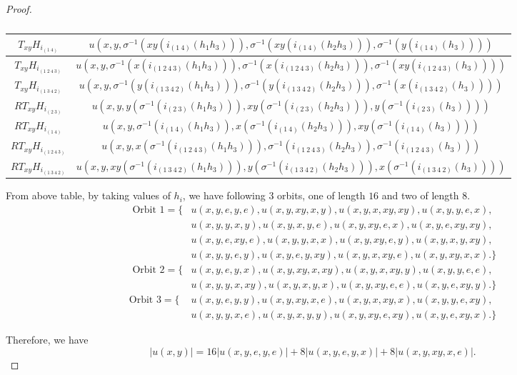 \documentclass[11pt,a4paper]{article}
\theoremstyle{definition}
\theoremstyle{remark}
\begin{document}
\begin{proof}
\begin{table}[H]
\begin{tabular}{|c|c|}
					$T_{xy}H_{i_{(1~4)}}$ & $u(x,y, \sigma^{-1}(xy(i_{(1~4)}(h_{1}h_{3}))),\sigma^{-1}(xy(i_{(1~4)}(h_{2}h_{3}))), \sigma^{-1}(y(i_{(1~4)}(h_{3}))))$ \\ \hline
					$T_{xy}H_{i_{(1~2~4~3)}}$ & $u(x,y, \sigma^{-1}(x(i_{(1~2~4~3)}(h_{1}h_{3}))),\sigma^{-1}(x(i_{(1~2~4~3)}(h_{2}h_{3}))), \sigma^{-1}(xy(i_{(1~2~4~3)}(h_{3}))))$ \\ \hline
					$T_{xy}H_{i_{(1~3~4~2)}}$ & $u(x,y, \sigma^{-1}(y(i_{(1~3~4~2)}(h_{1}h_{3}))),\sigma^{-1}(y(i_{(1~3~4~2)}(h_{2}h_{3}))), \sigma^{-1}(x(i_{(1~3~4~2)}(h_{3}))))$ \\ \hline
					$RT_{xy}H_{i_{(2~3)}}$ & $u(x,y, y(\sigma^{-1}(i_{(2~3)}(h_{1}h_{3}))),xy(\sigma^{-1}(i_{(2~3)}(h_{2}h_{3}))), y(\sigma^{-1}(i_{(2~3)}(h_{3}))))$ \\ \hline
					$RT_{xy}H_{i_{(1~4)}}$ & $u(x,y, \sigma^{-1}(i_{(1~4)}(h_{1}h_{3})),x(\sigma^{-1}(i_{(1~4)}(h_{2}h_{3}))), xy(\sigma^{-1}(i_{(1~4)}(h_{3}))))$ \\ \hline
					$RT_{xy}H_{i_{(1~2~4~3)}}$ & $u(x,y, x(\sigma^{-1}(i_{(1~2~4~3)}(h_{1}h_{3}))),\sigma^{-1}(i_{(1~2~4~3)}(h_{2}h_{3})), \sigma^{-1}(i_{(1~2~4~3)}(h_{3})))$ \\ \hline
					$RT_{xy}H_{i_{(1~3~4~2)}}$ & $u(x,y, xy(\sigma^{-1}(i_{(1~3~4~2)}(h_{1}h_{3}))),y(\sigma^{-1}(i_{(1~3~4~2)}(h_{2}h_{3}))), x(\sigma^{-1}(i_{(1~3~4~2)}(h_{3}))))$ \\ \hline		
				\end{tabular}\caption{} \label{t3}
			\end{table}
		\vspace{-.3cm}
		From above table, by taking values of $h_{i}$, we have following $3$ orbits, one of length $16$ and two of length $8$.
		\begin{align*}
		 			  \text{ Orbit 1}  =\{&u(x,y,e,y,e), u(x,y,xy,x,y),u(x,y,x,xy,xy),u(x,y,y,e,x),\\&u(x,y,y,x,y),u(x,y,x,y,e),u(x,y,xy,e,x),u(x,y,e,xy,xy),\\&u(x,y,e,xy,e),u(x,y,y,x,x),u(x,y,xy,e,y),u(x,y,x,y,xy),\\&u(x,y,y,e,y),u(x,y,e,y,xy),u(x,y,x,xy,e),u(x,y,xy,x,x).\}\\
		 			  \text{	Orbit 2}  =	\{&u(x,y,e,y,x), u(x,y,xy,x,xy),u(x,y,x,xy,y),u(x,y,y,e,e),\\&u(x,y,y,x,xy),u(x,y,x,y,x),u(x,y,xy,e,e),u(x,y,e,xy,y).\}\\
		 			  \text{Orbit 3} = \{&u(x,y,e,y,y), u(x,y,xy,x,e),u(x,y,x,xy,x),u(x,y,y,e,xy),\\&u(x,y,y,x,e),u(x,y,x,y,y),u(x,y,xy,e,xy),u(x,y,e,xy,x).\} 
				\end{align*}
			
				
		 Therefore, we have
		\[\vert u(x,y) \vert = 16 \vert u(x,y,e,y,e) \vert + 8 \vert u(x,y,e,y,x) \vert + 8\vert u(x,y,xy,x,e) \vert.\]
	\end{proof}
\end{document}
